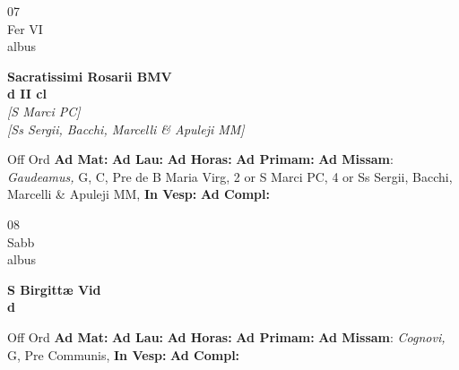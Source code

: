 \documentclass[10pt, openany]{book}
\begin{document}
    \begin{center}
        \begin{minipage}{3.5in}
            \vspace{2em}
            \begin{minipage}{0.5in}
                {\Huge 07} \\
                {\normalsize Fer VI} \\
                {\normalsize albus}
            \end{minipage}
            \begin{minipage}{3.0in}
                \textbf{ \large Sacratissimi Rosarii BMV \\
                \textnormal{\normalsize d II cl}} \\ \textit{[S Marci PC]} \\ \textit{[Ss Sergii, Bacchi, Marcelli \& Apuleji MM]} \\ 
            \end{minipage}
            \begin{justify}Off Ord
                \textbf{Ad Mat: }
                \textbf{Ad Lau: }
                \textbf{Ad Horas: }
                \textbf{Ad Primam: }\textbf{Ad Missam}: \textit{Gaudeamus,} G, C, Pre de B Maria Virg, 2 or S Marci PC, 4 or Ss Sergii, Bacchi, Marcelli \& Apuleji MM,  
                \textbf{In Vesp: }
                \textbf{Ad Compl: }
            \end{justify}
        \end{minipage}
    \end{center}

    \begin{center}
        \begin{minipage}{3.5in}
            \vspace{2em}
            \begin{minipage}{0.5in}
                {\Huge 08} \\
                {\normalsize Sabb} \\
                {\normalsize albus}
            \end{minipage}
            \begin{minipage}{3.0in}
                \textbf{ \large S Birgittæ Vid \\
                \textnormal{\normalsize d}} \\ 
            \end{minipage}
            \begin{justify}Off Ord
                \textbf{Ad Mat: }
                \textbf{Ad Lau: }
                \textbf{Ad Horas: }
                \textbf{Ad Primam: }\textbf{Ad Missam}: \textit{Cognovi,} G, Pre Communis,  
                \textbf{In Vesp: }
                \textbf{Ad Compl: }
            \end{justify}
        \end{minipage}
    \end{center}
\end{document}
